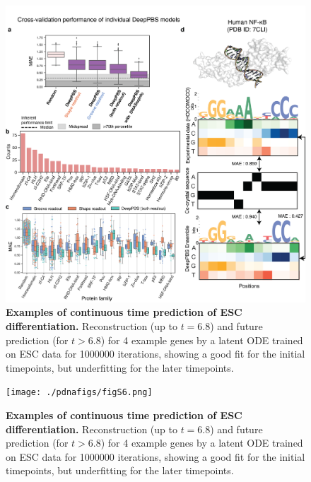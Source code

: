 \begin{center}
\begin{figure}[H]
  \includegraphics[width=\linewidth]{./pdnafigs/figS5.png}
    \caption[Examples of continuous time prediction of ESC differentiation.]{\textbf{Examples of continuous time prediction of ESC differentiation.} Reconstruction (up to $t=6.8$) and future prediction (for $t>6.8$) for 4 example genes by a  latent ODE \citep{chen2018neural} trained on ESC data \citep{Klein2015} for 1000000 iterations, showing a good fit for the initial timepoints, but underfitting for the later timepoints.}
  \label{fig:pdnaS5}
\end{figure}
\end{center}

\begin{center}
\begin{figure}[H]
  \texttt{[image: ./pdnafigs/figS6.png]}
    \caption[Examples of continuous time prediction of ESC differentiation.]{\textbf{Examples of continuous time prediction of ESC differentiation.} Reconstruction (up to $t=6.8$) and future prediction (for $t>6.8$) for 4 example genes by a  latent ODE \citep{chen2018neural} trained on ESC data \citep{Klein2015} for 1000000 iterations, showing a good fit for the initial timepoints, but underfitting for the later timepoints.}
  \label{fig:pdnaS6}
\end{figure}
\end{center}

